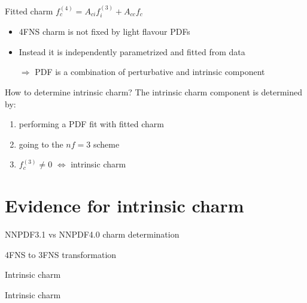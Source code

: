 \documentclass[aspectratio=43, 8pt,t]{beamer}
\begin{document}
\begin{frame}{Fitted charm}
  $f_c^{(4)} = A_{ci}f_i^{(3)}+A_{cc}f_c^{}$
  \begin{itemize}
    \item 4FNS charm is not fixed by light flavour PDFs
    \item Instead it is independently parametrized and fitted from data
    \item[$\Rightarrow$] PDF is a combination of perturbative and intrinsic component
  \end{itemize}

\end{frame}

\begin{frame}{How to determine intrinsic charm?}
  \vspace*{1em}
  The intrinsic charm component is determined by:
  \begin{enumerate}
    \item performing a PDF fit with fitted charm
    \item going to the $nf=3$ scheme
    \item $f_c^{(3)}\neq 0$ $\Leftrightarrow$ intrinsic charm
  \end{enumerate}


\end{frame}


\section{Evidence for intrinsic charm}


\begin{frame}{NNPDF3.1 vs NNPDF4.0 charm determination}

\end{frame}

\begin{frame}{4FNS to 3FNS transformation}

\end{frame}



\begin{frame}{Intrinsic charm}
\end{frame}

\begin{frame}{Intrinsic charm}
\end{frame}
\end{document}

